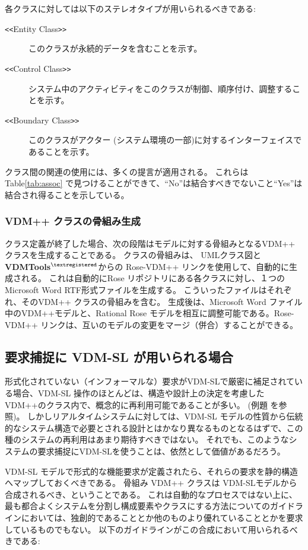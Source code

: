 \documentclass[\pformat,12pt]{jreport}
\newcommand{\vdmtools}{\textbf{VDMTools}$^{\mathbf{{\textregistered}}}$}
\begin{document}
各クラスに対しては以下のステレオタイプが用いられるべきである:
\begin{description}
\item[{\tt <<}Entity Class{\tt >>}] このクラスが永続的データを含むことを示す。
\item[{\tt <<}Control Class{\tt >>}] システム中のアクティビティをこのクラスが制御、順序付け、調整することを示す。
\item[{\tt <<}Boundary Class{\tt >>}] このクラスがアクター (システム環境の一部)に対するインターフェイスであることを示す。
\end{description}

クラス間の関連の使用には、多くの提言が適用される。
これらは Table\ref{tab:assoc} で見つけることができて、``No''は結合すべきでないこと``Yes''は結合され得ることを示している。

\subsubsection{VDM++ クラスの骨組み生成}\label{subsub:skeleton}

クラス定義が終了した場合、次の段階はモデルに対する骨組みとなるVDM++ クラスを生成することである。
クラスの骨組みは、 UMLクラス図と  \vdmtools からの Rose-VDM++ リンクを使用して、自動的に生成される。
これは自動的にRose リポジトリにある各クラスに対し、１つのMicrosoft Word RTF形式ファイルを生成する。
こういったファイルはそれぞれ、そのVDM++ クラスの骨組みを含む。
生成後は、Microsoft Word ファイル中のVDM++モデルと、Rational Rose モデルを相互に調整可能である。Rose-VDM++ リンクは、互いのモデルの変更をマージ（併合）することができる。

\subsection{要求捕捉に VDM-SL が用いられる場合}

形式化されていない（インフォーマルな）要求がVDM-SLで厳密に補足されている場合、VDM-SL 操作のほとんどは、構造や設計上の決定を考慮したVDM++のクラス内で、概念的に再利用可能であることが多い。 (例題 \cite{CashPoint}を参照)。
しかしリアルタイムシステムに対しては、VDM-SL モデルの性質から伝統的なシステム構造で必要とされる設計とはかなり異なるものとなるはずで、この種のシステムの再利用はあまり期待すべきではない。
それでも、このようなシステムの要求捕捉にVDM-SLを使うことは、依然として価値があるだろう。

VDM-SL モデルで形式的な機能要求が定義されたら、それらの要求を静的構造へマップしておくべきである。
骨組み VDM++ クラスは VDM-SLモデルから合成されるべき、ということである。
これは自動的なプロセスではない上に、最も都合よくシステムを分割し構成要素やクラスにする方法についてのガイドラインにおいては、独創的であることとか他のものより優れていることとかを要求しているものでもない。
以下のガイドラインがこの合成において用いられるべきである:
\end{document}
